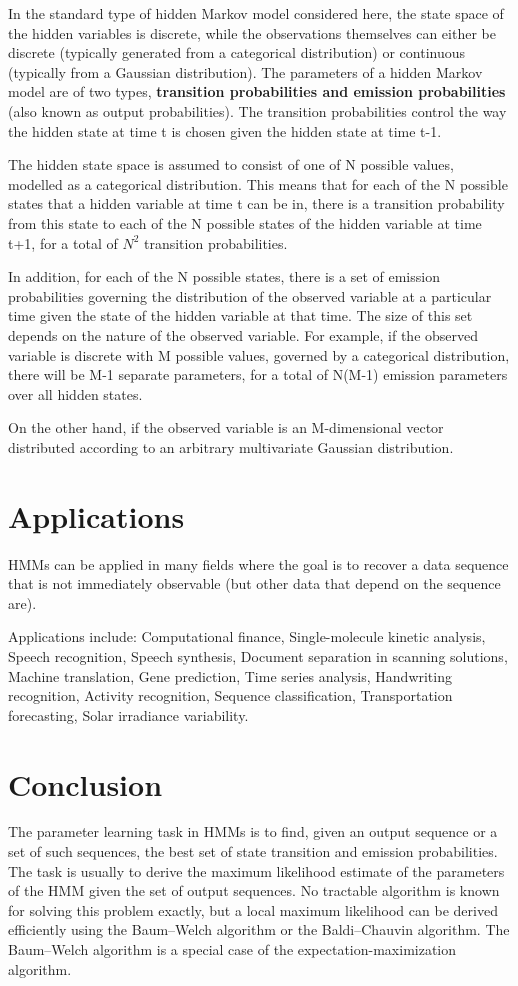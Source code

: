 \documentclass{article}
\begin{document}
In the standard type of hidden Markov model considered here, the state space of the hidden variables is discrete, while the observations themselves can either be discrete (typically generated from a categorical distribution) or continuous (typically from a Gaussian distribution). The parameters of a hidden Markov model are of two types, \textbf{transition probabilities and emission probabilities} (also known as output probabilities). The transition probabilities control the way the hidden state at time t is chosen given the hidden state at time t-1.

The hidden state space is assumed to consist of one of N possible values, modelled as a categorical distribution. This means that for each of the N possible states that a hidden variable at time t can be in, there is a transition probability from this state to each of the N possible states of the hidden variable at time t+1, for a total of $ N^2$ transition probabilities.

In addition, for each of the N possible states, there is a set of emission probabilities governing the distribution of the observed variable at a particular time given the state of the hidden variable at that time. The size of this set depends on the nature of the observed variable. For example, if the observed variable is discrete with M possible values, governed by a categorical distribution, there will be M-1 separate parameters, for a total of N(M-1) emission parameters over all hidden states.

On the other hand, if the observed variable is an M-dimensional vector distributed according to an arbitrary multivariate Gaussian distribution.



\section*{Applications}

HMMs can be applied in many fields where the goal is to recover a data sequence that is not immediately observable (but other data that depend on the sequence are). 

Applications include:
Computational finance,
Single-molecule kinetic analysis,
Speech recognition,
Speech synthesis,
Document separation in scanning solutions,
Machine translation,
Gene prediction,
Time series analysis,
Handwriting recognition,
Activity recognition,
Sequence classification,
Transportation forecasting,
Solar irradiance variability.

\section*{Conclusion}

The parameter learning task in HMMs is to find, given an output sequence or a set of such sequences, the best set of state transition and emission probabilities. The task is usually to derive the maximum likelihood estimate of the parameters of the HMM given the set of output sequences. No tractable algorithm is known for solving this problem exactly, but a local maximum likelihood can be derived efficiently using the Baum–Welch algorithm or the Baldi–Chauvin algorithm. The Baum–Welch algorithm is a special case of the expectation-maximization algorithm. 
\end{document}
